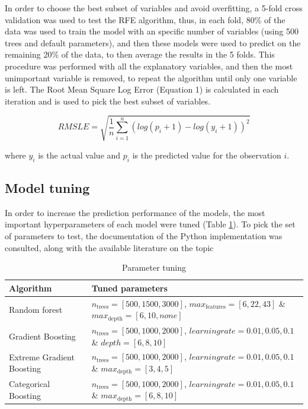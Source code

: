 \documentclass[11pt,onecolumn,titlepage,letterpaper]{article}
\begin{document}
In order to choose the best subset of variables and avoid overfitting, a 5-fold cross validation was used to test the RFE algorithm, thus, in each fold, 80\% of the data was used to train the model with an specific number of variables (using 500 trees and default parameters), and then these models were used to predict on the remaining 20\% of the data, to then average the results in the 5 folds. This procedure was performed with all the explanatory variables, and then the most unimportant variable is removed, to repeat the algorithm until only one variable is left. The Root Mean Square Log Error (Equation 1) is calculated in each iteration and is used to pick the best subset of variables.

\begin{equation}
RMSLE = \sqrt{\frac{1}{n} \sum_{i=1}^{n} (log(p_i + 1) - log(y_i+1))^2 }
\end{equation}

where $y_i$ is the actual value and $p_i$ is the predicted value for the observation $i$.

\subsection{Model tuning}

In order to increase the prediction performance of the models, the most important hyperparameters of each model were tuned (Table \ref{table:tuning}). To pick the set of parameters to test, the documentation of the Python implementation was consulted, along with the available literature on the topic \cite{Hastie2009, James2013}

\begin{table}[H]
	\begin{center}
		\begin{tabular}{|p{4.2cm}|p{10cm}|}
			\hline
			Algorithm & Tuned parameters \\
			\hline\hline
			Random forest & $n_\mathrm{trees} = [500,1500,3000]$, $max_\mathrm{features} = [6,22,43]$ \&  $max_\mathrm{depth} = [6,10,none]$\\
			Gradient Boosting & $n_\mathrm{trees} = [500,1000,2000]$, $learning rate = {0.01,0.05,0.1}$ \& $depth = [6,8,10]$\\
			Extreme Gradient Boosting  & $n_\mathrm{trees} = [500,1000,2000]$, $learning rate = {0.01,0.05,0.1}$ \& $max_\mathrm{depth} = [3,4,5]$ \\
			Categorical Boosting & $n_\mathrm{trees} = [500,1000,2000]$, $learning rate = {0.01,0.05,0.1}$ \& $max_\mathrm{depth} = [6,8,10]$\\
			\hline
		\end{tabular}
	\end{center}
	\caption{Parameter tuning}
	\label{table:tuning}
\end{table}
\end{document}
